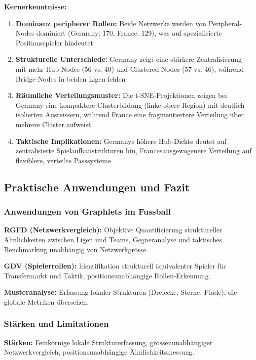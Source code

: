 \textbf{Kernerkenntnisse:}
\begin{enumerate}
  \item \textbf{Dominanz peripherer Rollen:} Beide Netzwerke werden von Peripheral-Nodes dominiert (Germany: 170, France: 129), was auf spezialisierte Positionsspieler hindeutet
  \item \textbf{Strukturelle Unterschiede:} Germany zeigt eine stärkere Zentralisierung mit mehr Hub-Nodes (56 vs. 40) und Clustered-Nodes (57 vs. 46), während Bridge-Nodes in beiden Ligen fehlen
  \item \textbf{Räumliche Verteilungsmuster:} Die t-SNE-Projektionen zeigen bei Germany eine kompaktere Clusterbildung (linke obere Region) mit deutlich isolierten Ausreissern, während France eine fragmentiertere Verteilung über mehrere Cluster aufweist
  \item \textbf{Taktische Implikationen:} Germanys höhere Hub-Dichte deutet auf zentralisierte Spielaufbaustrukturen hin, Francesausgewogenere Verteilung auf flexiblere, verteilte Passsysteme
\end{enumerate}

\subsection{Praktische Anwendungen und Fazit}

\subsubsection{Anwendungen von Graphlets im Fussball}

\textbf{RGFD (Netzwerkvergleich):} Objektive Quantifizierung struktureller Ähnlichkeiten zwischen Ligen und Teams, Gegneranalyse und taktisches Benchmarking unabhängig von Netzwerkgrösse.

\textbf{GDV (Spielerrollen):} Identifikation strukturell äquivalenter Spieler für Transfermarkt und Taktik, positionsunabhängige Rollen-Erkennung.

\textbf{Musteranalyse:} Erfassung lokaler Strukturen (Dreiecke, Sterne, Pfade), die globale Metriken übersehen.

\subsubsection{Stärken und Limitationen}

\textbf{Stärken:} Feinkörnige lokale Strukturerfassung, grössenunabhängiger Netzwerkvergleich, positionsunabhängige Ähnlichkeitsmessung.

